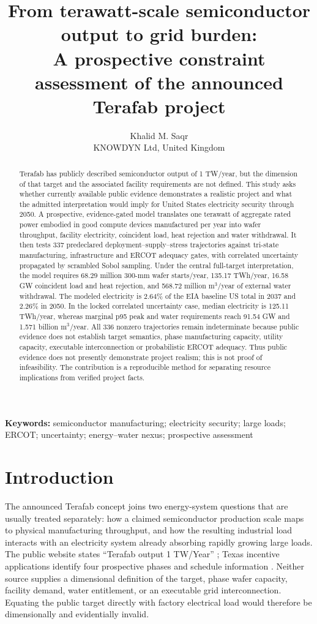 \documentclass[11pt]{article}
\title{From terawatt-scale semiconductor output to grid burden:\\
A prospective constraint assessment of the announced Terafab project}
\author{Khalid M. Saqr\\
\small KNOWDYN Ltd, United Kingdom}
\date{}
\newcommand{\Terafab}{Terafab}
\begin{document}
\linenumbers
\maketitle

\begin{abstract}
Terafab has publicly described semiconductor output of 1 TW/year, but the
dimension of that target and the associated facility requirements are not
defined. This study asks whether currently available public evidence
demonstrates a realistic project and what the admitted interpretation would
imply for United States electricity security through 2050. A prospective,
evidence-gated model translates one terawatt of aggregate rated power embodied
in good compute devices manufactured per year into wafer throughput, facility
electricity, coincident load, heat rejection and water withdrawal. It then
tests 337 predeclared deployment--supply--stress trajectories against tri-state
manufacturing, infrastructure and ERCOT adequacy gates, with correlated
uncertainty propagated by scrambled Sobol sampling. Under the central
full-target interpretation, the model requires 68.29 million 300-mm wafer
starts/year, 135.17 TWh/year, 16.58 GW coincident load and heat rejection, and
568.72 million m$^3$/year of external water withdrawal. The modeled electricity
is 2.64\% of the EIA baseline US total in 2037 and 2.26\% in 2050. In the locked
correlated uncertainty case, median electricity is 125.11 TWh/year, whereas
marginal p95 peak and water requirements reach 91.54 GW and 1.571 billion
m$^3$/year. All 336 nonzero trajectories remain indeterminate because public
evidence does not establish target semantics, phase manufacturing capacity,
utility capacity, executable interconnection or probabilistic ERCOT adequacy.
Thus public evidence does not presently demonstrate project realism; this is
not proof of infeasibility. The contribution is a reproducible method for
separating resource implications from verified project facts.
\end{abstract}

\noindent\textbf{Keywords:} semiconductor manufacturing; electricity security;
large loads; ERCOT; uncertainty; energy--water nexus; prospective assessment

\section{Introduction}
\label{sec:introduction}

The announced \Terafab{} concept joins two energy-system questions that are
usually treated separately: how a claimed semiconductor production scale maps
to physical manufacturing throughput, and how the resulting industrial load
interacts with an electricity system already absorbing rapidly growing large
loads. The public website states ``Terafab output 1 TW/Year''
\cite{Terafab2026}; Texas incentive applications identify four prospective
phases and schedule information \cite{JETI2026}. Neither source supplies a
dimensional definition of the target, phase wafer capacity, facility demand,
water entitlement, or an executable grid interconnection. Equating the public
target directly with factory electrical load would therefore be dimensionally
and evidentially invalid.
\end{document}
